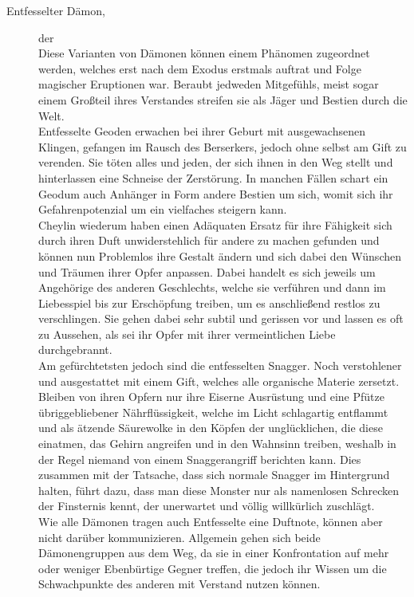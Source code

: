 \documentclass[a4paper,12pt,oneside]{book}
\begin{document}
\begin{description}
\item[Entfesselter Dämon,] der
\\Diese Varianten von Dämonen können einem Phänomen zugeordnet werden, welches erst nach dem Exodus erstmals auftrat und Folge magischer Eruptionen war. Beraubt jedweden Mitgefühls, meist sogar einem Großteil ihres Verstandes streifen sie als Jäger und Bestien durch die Welt.
\\ Entfesselte Geoden erwachen bei ihrer Geburt mit ausgewachsenen Klingen, gefangen im Rausch des Berserkers, jedoch ohne selbst am Gift zu verenden. Sie töten alles und jeden, der sich ihnen in den Weg stellt und hinterlassen eine Schneise der Zerstörung. In manchen Fällen schart ein Geodum auch Anhänger in Form andere Bestien um sich, womit sich ihr Gefahrenpotenzial um ein vielfaches steigern kann.
\\Cheylin wiederum haben einen Adäquaten Ersatz für ihre Fähigkeit sich durch ihren Duft unwiderstehlich für andere zu machen gefunden und können nun Problemlos ihre Gestalt ändern und sich dabei den Wünschen und Träumen ihrer Opfer anpassen. Dabei handelt es sich jeweils um Angehörige des anderen Geschlechts, welche sie verführen und dann im Liebesspiel bis zur Erschöpfung treiben, um es anschließend restlos zu verschlingen. Sie gehen dabei sehr subtil und gerissen vor und lassen es oft zu Aussehen, als sei ihr Opfer mit ihrer vermeintlichen Liebe durchgebrannt.
\\Am gefürchtetsten jedoch sind die entfesselten Snagger. Noch verstohlener und ausgestattet mit einem Gift, welches alle organische Materie zersetzt. Bleiben von ihren Opfern nur ihre Eiserne Ausrüstung und eine Pfütze übriggebliebener Nährflüssigkeit, welche im Licht schlagartig entflammt und als ätzende Säurewolke in den Köpfen der unglücklichen, die diese einatmen, das Gehirn angreifen und in den Wahnsinn treiben, weshalb in der Regel niemand von einem Snaggerangriff berichten kann. Dies zusammen mit der Tatsache, dass sich normale Snagger im Hintergrund halten, führt dazu, dass man diese Monster nur als namenlosen Schrecken der Finsternis kennt, der unerwartet und völlig willkürlich zuschlägt.
\\Wie alle Dämonen tragen auch Entfesselte eine Duftnote, können aber nicht darüber kommunizieren. Allgemein gehen sich beide Dämonengruppen aus dem Weg, da sie in einer Konfrontation auf mehr oder weniger Ebenbürtige Gegner treffen, die jedoch ihr Wissen um die Schwachpunkte des anderen mit Verstand nutzen können.


\end{description}
\end{document}

